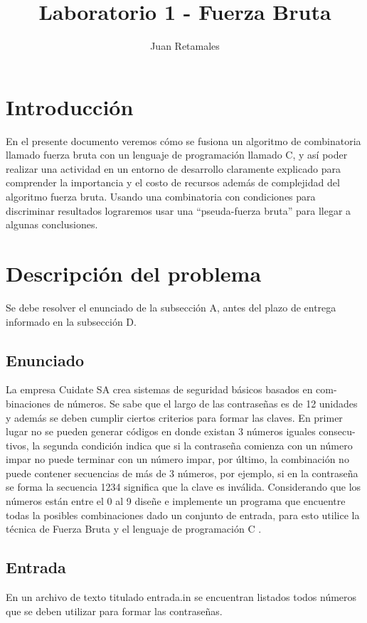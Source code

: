 \documentclass[9pt,twocolumn,twoside]{optica}
\title{Laboratorio 1 - Fuerza Bruta}
\author{Juan Retamales}
\affil{Profesora: Mónica Villanueva}
\affil{Ayudante: Patricio Vargas}
\begin{document}
\maketitle

\section{Introducción}{
	\par{En}
    el presente documento veremos cómo se fusiona un algoritmo de combinatoria llamado fuerza bruta con un lenguaje de programación llamado C, y así poder realizar una actividad en un entorno de desarrollo claramente explicado para comprender la importancia y el costo de recursos además de complejidad del algoritmo fuerza bruta.
Usando una combinatoria con condiciones para discriminar resultados lograremos usar una “pseuda-fuerza bruta” para llegar a algunas conclusiones.

}

\section{Descripción del problema}
Se debe resolver el enunciado de la subsección A, antes del plazo de entrega informado en la subsección D.
\subsection{Enunciado}
La empresa
Cuidate SA
crea sistemas de seguridad básicos basados en com-
binaciones de números. Se sabe que el largo de las contraseñas es de 12 unidades
y además se deben cumplir ciertos criterios para formar las claves. En primer
lugar no se pueden generar códigos en donde existan 3 números iguales consecu-
tivos, la segunda condición indica que si la contraseña comienza con un número
impar no puede terminar con un número impar, por último, la combinación no
puede contener secuencias de más de 3 números, por ejemplo, si en la contraseña
se forma la secuencia 1234 significa que la clave es inválida. Considerando que
los números están entre el 0 al 9 diseñe e implemente un programa que encuentre
todas la posibles combinaciones dado un conjunto de entrada, para esto utilice
la técnica de Fuerza Bruta y el lenguaje de programación C \cite{actividad}.

\subsection{Entrada}
En un archivo de texto titulado
entrada.in
se encuentran listados todos
números que se deben utilizar para formar las contraseñas.
\end{document}
